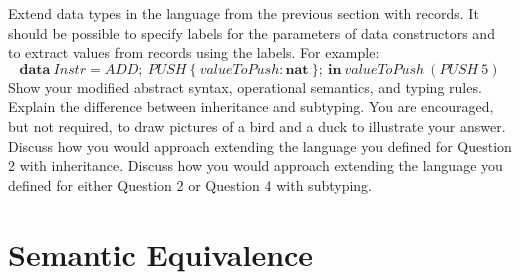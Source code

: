 \documentclass[10pt,a4paper]{exam} %
\begin{document}
\begin{questions}
\question[10] Extend data types in the language from the previous section with records. It should be possible to specify labels for the parameters of data constructors and to extract values from records using the labels. For example:
\begin{displaymath}
\mathbf{data}~\mathit{Instr} = \mathit{ADD};~\mathit{PUSH}~\{~\mathit{valueToPush} : \mathbf{nat}~\};~\mathbf{in}~\mathit{valueToPush}~(\mathit{PUSH}~5)
\end{displaymath}
Show your modified abstract syntax, operational semantics, and typing rules. \droppoints 
\question[2] Explain the difference between inheritance and subtyping. You are encouraged, but not required, to draw pictures of a bird and a duck to illustrate your answer. \droppoints 
\question[5] Discuss how you would approach extending the language you defined for Question 2 with inheritance. \droppoints 
\question[5] Discuss how you would approach extending the language you defined for either Question 2 or Question 4 with subtyping. \droppoints 

\section*{Semantic Equivalence}

\newcommand{\receive}[2]{#1(#2)}
\newcommand{\send}[2]{\overline{#1}\langle #2 \rangle}
\newcommand{\channel}[1]{(\nu #1)}


\end{questions}
\end{document}
